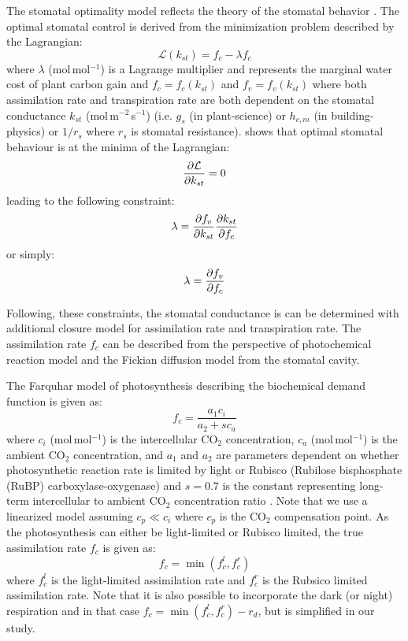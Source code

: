 The stomatal optimality model reflects the theory of the stomatal behavior \citep{Cowan1978}. The optimal stomatal control is derived from the minimization problem described by the Lagrangian:
\begin{equation} 
\mathcal{L}(k_{st}) = f_c - \lambda f_c
\end{equation}
where $\lambda$ (mol\,mol$^{-1}$) is a Lagrange multiplier and represents the marginal water cost of plant carbon gain \citep{Medlyn2011,Katul2010,Manoli2014} and $f_c = f_c(k_{st})$ and $f_v=f_v(k_{st})$ where both assimilation rate and transpiration rate are both dependent on the stomatal conductance $k_{\textit{st}}$ (mol\,m$^{-2}$\,s$^{-1}$) (i.e. $g_s$ (in plant-science) or $h_{c,m}$ (in building-physics) or $1/r_s$ where $r_s$ is stomatal resistance). \cite{Cowan1978} shows that optimal stomatal behaviour is at the minima of the Lagrangian:
\begin{equation}
\frac{\partial \mathcal{L}}{\partial k_{st}} = 0
\end{equation}
leading to the following constraint:
\begin{equation}
\lambda = \frac{\partial f_v}{\partial k_{st}}\frac{\partial k_{st}}{\partial f_c} 
\end{equation}
or simply:
\begin{equation}
\lambda = \frac{\partial f_v}{\partial f_c} 
\end{equation}

Following, these constraints, the stomatal conductance is can be determined with additional closure model for assimilation rate and transpiration rate. The assimilation rate $f_c$ can be described from the perspective of photochemical reaction model and the Fickian diffusion model from the stomatal cavity. 

The Farquhar model of photosynthesis describing the biochemical demand function is given as:
\begin{equation}
f_c = \frac{a_1 c_i}{a_2 + sc_a}
\end{equation}
where $c_i$ (mol\,mol$^{-1}$)  is the intercellular CO$_2$ concentration, $c_a$ (mol\,mol$^{-1}$) is the ambient CO$_2$ concentration, and $a_1$ and $a_2$ are parameters dependent on whether photosynthetic reaction rate is limited by light or Rubisco (Rubilose bisphosphate (RuBP) carboxylase-oxygenase) \citep{Katul2010, Farquhar1980} and $s=0.7$ is the constant representing long-term intercellular to ambient CO$_2$ concentration ratio \citep{Volpe2013}. Note that we use a linearized model assuming $c_p \ll c_i$ where $c_p$ is the CO$_2$ compensation point. As the photosynthesis can either be light-limited or Rubisco limited, the true assimilation rate $f_c$ is given as:
\begin{equation}
f_c = \min \left(f_{c}^l, f_c^r\right) 
\end{equation}
where $f_c^l$ is the light-limited assimilation rate and $f_c^r$ is the Rubsico limited assimilation rate. Note that it is also possible to incorporate the dark (or night) respiration and in that case $f_c = \min \left(f_c^l, f_c^r\right) - r_d$, but is simplified in our study.

